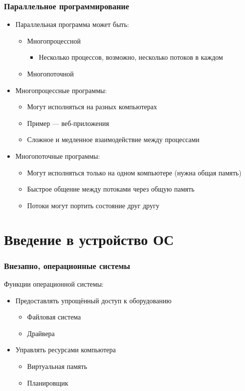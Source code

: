 \documentclass[xetex,mathserif,serif]{beamer}
\begin{document}
	\begin{frame}
		\frametitle{Параллельное программирование}
		\begin{itemize}
			\item Параллельная программа может быть:
			\begin{itemize}
				\item Многопроцессной
				\begin{itemize}
					\item Несколько процессов, возможно, несколько потоков в каждом
				\end{itemize}
				\item Многопоточной
			\end{itemize}
			\item Многопроцессные программы:
			\begin{itemize}
				\item Могут исполняться на разных компьютерах
				\item Пример --- веб-приложения
				\item Сложное и медленное взаимодействие между процессами
			\end{itemize}
			\item Многопоточные программы:
			\begin{itemize}
				\item Могут исполняться только на одном компьютере (нужна общая память)
				\item Быстрое общение между потоками через общую память
				\item Потоки могут портить состояние друг другу
			\end{itemize}
		\end{itemize}
	\end{frame}

	\section{Введение в устройство ОС}

	\begin{frame}
		\frametitle{Внезапно, операционные системы}
		Функции операционной системы:
		\begin{itemize}
			\item Предоставлять упрощённый доступ к оборудованию
			\begin{itemize}
				\item Файловая система
				\item Драйвера
			\end{itemize}
			\item Управлять ресурсами компьютера
			\begin{itemize}
				\item Виртуальная память
				\item Планировщик
			\end{itemize}
		\end{itemize}
	\end{frame}
\end{document}
